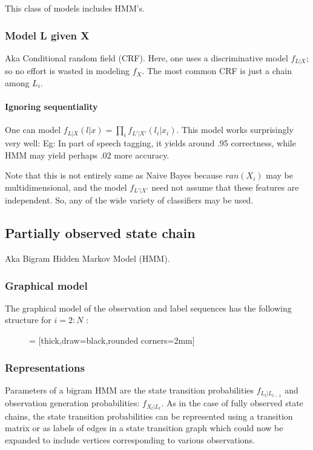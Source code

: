 \documentclass[oneside, article]{memoir}
\begin{document}
This class of models includes HMM's.

\subsubsection{Model L given X}
Aka Conditional random field (CRF). Here, one uses a discriminative model $f_{L|X}$; so no effort is wasted in modeling $f_X$. The most common CRF is just a chain among $L_i$.

\paragraph{Ignoring sequentiality}
One can model $f_{L|X}(l |x) = \prod_i f_{L'|X'} (l_i|x_i)$. This model works surprisingly very well: Eg: In part of speech tagging, it yields around .95 correctness, while HMM may yield perhaps .02 more accuracy.

Note that this is not entirely same as Naive Bayes because $ran(X_i)$ may be multidimensional, and the  model $f_{L'|X'}$ need not assume that these features are independent. So, any of the wide variety of classifiers may be used.

\subsection{Partially observed state chain}
Aka Bigram Hidden Markov Model (HMM).

\subsubsection{Graphical model}
The graphical model of the observation and label sequences has the following structure for $i = 2:N$ :

\begin{figure}[!htb]
 = [thick,draw=black,rounded corners=2mm]
\end{figure}

\subsubsection{Representations}
Parameters of a bigram HMM are the state transition probabilities $f_{L_t|L_{t-1}}$ and observation generation probabilities: $f_{X_t|L_t}$. As in the case of fully observed state chains, the state transition probabilities can be represented using a transition matrix or as labels of edges in a state transition graph which could now be expanded to include vertices corresponding to various observations.
\end{document}

